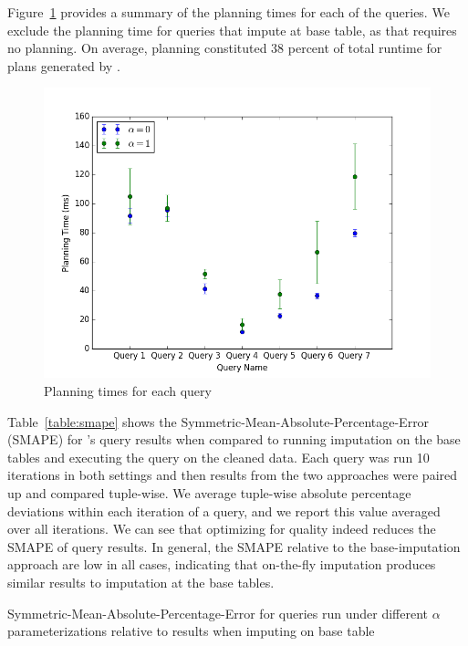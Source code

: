 Figure~\ref{fig:plantimes} provides a summary of the planning times for each of the queries.  We exclude the planning time for queries that impute at base table, as that
requires no planning. On average, planning constituted 38 percent of total runtime for plans generated by \ProjectName{}.

\begin{figure}
\includegraphics[width=\columnwidth]{figures/planning_times_imputedb.png}
\caption{Planning times for each query}
\label{fig:plantimes}
\end{figure}

Table~\ref{table:smape} shows the Symmetric-Mean-Absolute-Percentage-Error (SMAPE) for \ProjectName{}'s query results when compared to 
running imputation on the base tables and executing the query on the
cleaned data. Each query was run 10 iterations in both settings and then results from the two approaches were paired up and compared tuple-wise. We average tuple-wise
absolute percentage deviations within each iteration of a query, and we report this value averaged over all iterations.
We can see that optimizing for quality indeed reduces the SMAPE of query results. In general, the SMAPE relative to the
base-imputation approach are low in all cases, indicating that on-the-fly imputation produces similar results to
imputation at the base tables.

\begin{table}
\centering

\caption{Symmetric-Mean-Absolute-Percentage-Error for queries run under different $\alpha$ parameterizations relative to results when imputing on base table}
\label{table:smape}
\end{table}

